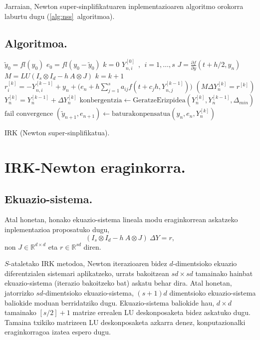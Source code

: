 Jarraian, Newton super-sinplifikatuaren inplementazioaren algoritmo orokorra laburtu dugu (\ref{alg:nss}~algoritmoa).

\subsection*{Algoritmoa.}

\begin{algorithm}[H]
 \BlankLine
  $\tilde{y}_0=fl(y_0)$\;
  $e_0=fl(y_0-\tilde{y}_0)$\;
  {
   \BlankLine
   $k=0$\;
    $Y_{n,i}^{[0]} \ \ , \ \ i=1,\dots,s $\;
   \BlankLine
   $J=\frac{\partial f}{\partial y}(t+h/2,y_n) $\; 
   $M=LU(I_s \otimes I_d - h \ A \otimes J)$\;
   \BlankLine
   {
    \BlankLine 
    $k=k+1$\;
    $r_i^{[k]}=-Y_{n,i}^{[k-1]}+y_n+\big(e_n+h \sum\limits_{j=1}^{s} a_{ij} f(t+c_jh,Y_{n,j}^{[k-1]})\big) $\;
     $(M \Delta Y_n^{[k]}=r^{[k]})$\;
    $Y_n^{[k]}=Y_n^{[k-1]}+\Delta Y_n^{[k]}$\;
    $\text{konbergentzia} \leftarrow \text{GeratzeErizpidea}(Y_n^{[k]},Y_n^{[k-1]},\Delta_{min}) $\;
   }
   \BlankLine
   {
     {$\text{fail convergence}$\;}
   }
   {$(\tilde y_{n+1},e_{n+1})\leftarrow \text{baturakonpensatua}(y_n,e_n,Y_n^{[k]})$\;}    
 }
 \caption{IRK (Newton super-sinplifikatua).}
 \label{alg:nss}
\end{algorithm}



\section{IRK-Newton eraginkorra.}
\label{sec:7.3}

\subsection{Ekuazio-sistema.}

Atal honetan, honako ekuazio-sistema lineala modu eraginkorrean askatzeko inplementazioa proposatuko dugu,
\begin{equation}
\label{eq:linsys}
(I_s \otimes I_d - h \ A \otimes J) \ \Delta Y = r,
\end{equation}
non $J \in \mathbb{R}^{d \times d}$  eta $r \in \mathbb{R}^{sd}$ diren.

$S$-ataletako IRK metodoa, Newton iterazioaren bidez $d$-dimentsioko ekuazio diferentzialen sistemari aplikatzeko, urrats bakoitzean $sd \times sd$ tamainako hainbat ekuazio-sistema (iterazio bakoitzeko bat) askatu behar dira. Atal honetan, jatorrizko $sd$-dimentsioko ekuazio-sistema, $(s+1)d$ dimentsioko ekuazio-sistema baliokide moduan berridatziko dugu. Ekuazio-sistema baliokide hau,  $d \times d$ tamainako $[s/2]+1$ matrize errealen LU deskonposaketa bidez askatuko dugu. Tamaina txikiko matrizeen LU deskonposaketa azkarra denez, konputazionalki eraginkorragoa izatea espero dugu.      

